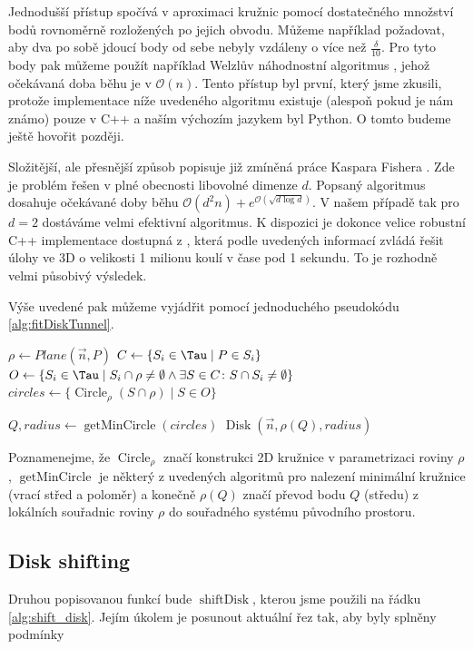 Jednodušší přístup spočívá v aproximaci kružnic pomocí dostatečného množství bodů
rovnoměrně rozložených po jejich obvodu. Můžeme například požadovat, aby dva
po sobě jdoucí body od sebe nebyly vzdáleny o více než $ \frac{\delta}{10} $.
Pro tyto body pak můžeme použít například Welzlův náhodnostní algoritmus
\cite{WelzlRandom}, jehož očekávaná doba běhu je v $ \mathcal{O}(n) $. Tento
přístup byl první, který jsme zkusili, protože implementace níže uvedeného algoritmu
existuje (alespoň pokud je nám známo) pouze v C++ a naším výchozím jazykem byl
Python. O tomto budeme ještě hovořit později.

Složitější, ale přesnější způsob popisuje již zmíněná práce Kaspara Fishera
\cite{FisherBalls}. Zde je problém řešen v plné obecnosti libovolné dimenze $ d $.
Popsaný algoritmus dosahuje očekávané doby běhu
$ \mathcal{O}(d^2n) + e^{\mathcal{O}(\sqrt{d \log{d}})} $. V našem případě tak pro
$ d = 2 $ dostáváme velmi efektivní algoritmus. K dispozici je dokonce velice
robustní C++ implementace dostupná z \cite{cpp_balls}, která podle uvedených informací
zvládá řešit úlohy ve 3D o velikosti 1 milionu koulí v čase pod 1 sekundu. To
je rozhodně velmi působivý výsledek.

Výše uvedené pak můžeme vyjádřit pomocí jednoduchého pseudokódu \ref{alg:fitDiskTunnel}.

\begin{algorithmic}[1]
\label{alg:fitDiskTunnel}

    \State $ \rho \gets Plane(\vec{n}, P) $
    \State $ C \gets \{S_i \in \Tau \mid P \in S_i \} $
    \State $ O \gets \{ S_i \in \Tau
        \mid S_i \cap \rho \neq \emptyset
            \wedge \exists S \in C \colon S \cap S_i \neq \emptyset  \} $
    \State $ circles \gets \{ \operatorname{Circle}_{\rho}(S \cap \rho) \mid S \in O \} $
    \State

    \State $ Q, radius \gets \operatorname{getMinCircle}(circles) $
    \State \Return $ \operatorname{Disk}(\vec{n}, \rho(Q), radius) $
\EndFunction

\end{algorithmic}

Poznamenejme, že $ \operatorname{Circle}_{\rho} $ značí konstrukci 2D kružnice
v parametrizaci roviny $ \rho $, $ \operatorname{getMinCircle} $ je některý z
uvedených algoritmů pro nalezení minimální kružnice (vrací střed a poloměr)
a konečně $ \rho(Q) $ značí převod bodu $ Q $ (středu) z lokálních souřadnic
roviny $ \rho $ do souřadného systému původního prostoru.


\subsection{Disk shifting}
Druhou popisovanou funkcí bude $ \operatorname{shiftDisk} $, kterou jsme použili
na řádku \ref{alg:shift_disk}. Jejím úkolem je posunout aktuální řez tak, aby
byly splněny podmínky
